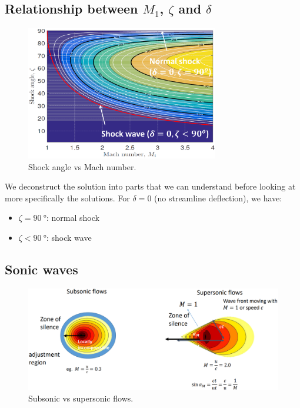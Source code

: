 \documentclass[class=report, crop=false, 12pt,a4paper]{standalone}
\begin{document}
\subsection{Relationship between $M_1$, $\zeta$ and $\delta$}
\begin{figure}[H]
    \centering
    \includegraphics[width = 0.75\textwidth]{../img/diagram12.png}
    \caption{Shock angle vs Mach number.}
\end{figure}
We deconstruct the solution into parts that we can understand before looking at more specifically the solutions. For $\delta = 0$ (no streamline deflection), we have:
\begin{itemize}[noitemsep]
    \item $\zeta = \SI{90}{\degree}$: normal shock
    \item $\zeta < \SI{90}{\degree}$: shock wave
\end{itemize}
\subsection{Sonic waves}
\begin{figure}[H]
    \centering
    \includegraphics[width = \textwidth]{../img/diagram13.png}
    \caption{Subsonic vs supersonic flows.}
\end{figure}
\end{document}
